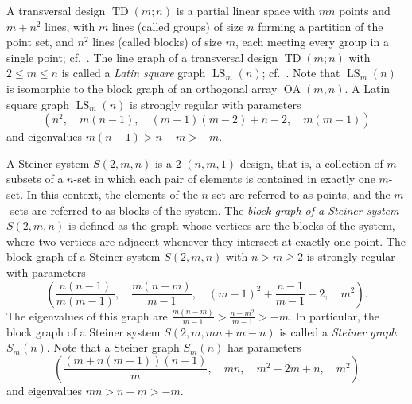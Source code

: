 \begin{example}
A transversal design $\operatorname{TD}(m;n)$ is a partial linear space with $mn$ points and $m + n^2$ lines, with $m$ lines (called groups) of size $n$ forming a partition of the point set, and $n^2$ lines (called blocks) of size $m$, each meeting every group in a single point; cf.~\cite[Section 8.4.1]{BrVM2022}.
The line graph of a transversal design $\operatorname{TD}(m;n)$ with $2 \leqslant m \leqslant n$ is called a \emph{Latin square} graph $\operatorname{LS}_m(n)$; cf.~\cite[Section 8.4.2]{BrVM2022}.
Note that $\operatorname{LS}_m(n)$ is isomorphic to the block graph of an orthogonal array $\operatorname{OA}(m,n)$.
A Latin square graph $\operatorname{LS}_m(n)$ is strongly regular with parameters
\begin{equation}\label{eq:LS parameters}
	(n^2, \quad m(n-1), \quad (m-1)(m-2)+n-2, \quad m(m-1))
\end{equation}
and eigenvalues $m(n-1)>n-m>-m$.
\end{example}

\begin{example}
A Steiner system $S(2,m,n)$ is a $2$-$(n,m,1)$ design, that is, a collection of $m$-subsets of a $n$-set in which each pair of elements is contained in exactly one $m$-set.
In this context, the elements of the $n$-set are referred to as points, and the $m$-sets are referred to as blocks of the system.
The \emph{block graph of a Steiner system} $S(2, m, n)$ is defined as the graph whose vertices are the blocks of the system, where two vertices are adjacent whenever they intersect at exactly one point.
The block graph of a Steiner system $S(2, m, n)$ with $n>m\geqslant 2$ is strongly regular with parameters
\begin{equation}
	\left(\frac{n(n-1)}{m(m-1)}, \quad \frac{m(n-m)}{m-1}, \quad (m-1)^2 +\frac{n-1}{m-1} -2, \quad m^2\right).
\end{equation}
The eigenvalues of this graph are $\frac{m(n-m)}{m-1} > \frac{n-m^2}{m-1} > -m$.
In particular, the block graph of a Steiner system $S(2, m, mn + m -n)$ is called a \emph{Steiner graph} $S_m(n)$. 
Note that a Steiner graph $S_m(n)$ has parameters
\begin{equation}\label{eq:SG parameters}
	\left( \frac{(m+n(m-1))(n+1)}{m}, \quad mn, \quad m^2-2m+n, \quad m^2 \right)
\end{equation}
and eigenvalues $mn>n-m>-m$.
\end{example}




